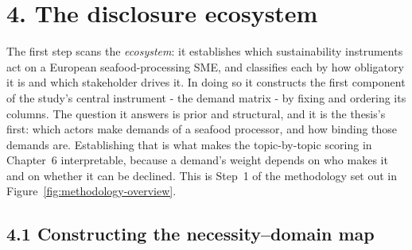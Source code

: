 
\section{4. The disclosure ecosystem}\label{angle1-ecosystem}

The first step scans the \emph{ecosystem}: it establishes which sustainability
instruments act on a European seafood-processing SME, and classifies each by how
obligatory it is and which stakeholder drives it. In doing so it constructs the
first component of the study's central instrument - the demand matrix - by
fixing and ordering its columns. The question it answers is prior and
structural, and it is the thesis's first: which actors make demands of a
seafood processor, and how binding those demands are. Establishing that is what
makes the topic-by-topic scoring in Chapter~6 interpretable, because a demand's
weight depends on who makes it and on whether it can be declined. This is Step~1
of the methodology set out in Figure~\ref{fig:methodology-overview}.

\subsection{4.1 Constructing the necessity--domain
map}\label{ecosystem-construction}

